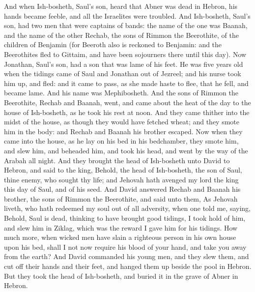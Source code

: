 And when Ish-bosheth, Saul’s son, heard that Abner was dead in Hebron, his hands became feeble, and all the Israelites were troubled. And Ish-bosheth, Saul’s son, had two men that were captains of bands: the name of the one was Baanah, and the name of the other Rechab, the sons of Rimmon the Beerothite, of the children of Benjamin (for Beeroth also is reckoned to Benjamin: and the Beerothites fled to Gittaim, and have been sojourners there until this day).  Now Jonathan, Saul’s son, had a son that was lame of his feet. He was five years old when the tidings came of Saul and Jonathan out of Jezreel; and his nurse took him up, and fled: and it came to pass, as she made haste to flee, that he fell, and became lame. And his name was Mephibosheth.  And the sons of Rimmon the Beerothite, Rechab and Baanah, went, and came about the heat of the day to the house of Ish-bosheth, as he took his rest at noon. And they came thither into the midst of the house, as though they would have fetched wheat; and they smote him in the body: and Rechab and Baanah his brother escaped. Now when they came into the house, as he lay on his bed in his bedchamber, they smote him, and slew him, and beheaded him, and took his head, and went by the way of the Arabah all night. And they brought the head of Ish-bosheth unto David to Hebron, and said to the king, Behold, the head of Ish-bosheth, the son of Saul, thine enemy, who sought thy life; and Jehovah hath avenged my lord the king this day of Saul, and of his seed. And David answered Rechab and Baanah his brother, the sons of Rimmon the Beerothite, and said unto them, As Jehovah liveth, who hath redeemed my soul out of all adversity, when one told me, saying, Behold, Saul is dead, thinking to have brought good tidings, I took hold of him, and slew him in Ziklag, which was the reward I gave him for his tidings. How much more, when wicked men have slain a righteous person in his own house upon his bed, shall I not now require his blood of your hand, and take you away from the earth? And David commanded his young men, and they slew them, and cut off their hands and their feet, and hanged them up beside the pool in Hebron. But they took the head of Ish-bosheth, and buried it in the grave of Abner in Hebron. 

